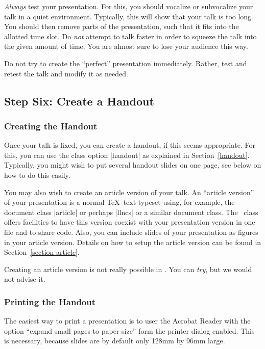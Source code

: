 \emph{Always} test your presentation. For this, you should vocalize or subvocalize your talk in a quiet environment. Typically, this will show that your talk is too long. You should then remove parts of the presentation, such that it fits into the allotted time slot. Do \emph{not} attempt to talk faster in order to squeeze the talk into the given amount of time. You are almost sure to lose your audience this way.

Do not try to create the ``perfect'' presentation immediately. Rather, test and retest the talk and modify it as needed.


\subsection{Step Six: Create a Handout}

\subsubsection{Creating the Handout}

Once your talk is fixed, you can create a handout, if this seems appropriate. For this, you can use the class option |handout| as explained in Section~\ref{handout}. Typically, you might wish to put several handout slides on one page, see below on how to do this easily.

You may also wish to create an article version of your talk. An ``article version'' of your presentation is a normal \TeX\ text typeset using, for example, the document class |article| or perhaps |llncs| or a similar document class. The \beamer\ class offers facilities to have this version coexist with your presentation version in one file and to share code. Also, you can include slides of your presentation as figures in your article version. Details on how to setup the article version can be found in Section~\ref{section-article}.

\lyxnote
Creating an article version is not really possible in \LyX. You can \emph{try}, but we would not advise it.

\subsubsection{Printing the Handout}
\label{section-printing-version}

The easiest way to print a presentation is to user the Acrobat Reader with the option ``expand small pages to paper size'' form the printer dialog enabled. This is necessary, because slides are by default only 128mm by 96mm large.

